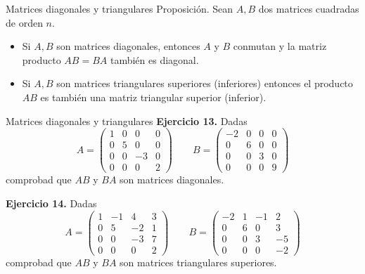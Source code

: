 \documentclass[
  ignorenonframetext,
]{beamer}
\providecommand{\tightlist}{%
  \setlength{\itemsep}{0pt}\setlength{\parskip}{0pt}}
\begin{document}
\begin{frame}{Matrices diagonales y triangulares}
\protect\hypertarget{matrices-diagonales-y-triangulares}{}
Proposición. Sean \(A,B\) dos matrices cuadradas de orden \(n\).

\begin{itemize}
\tightlist
\item
  Si \(A,B\) son matrices diagonales, entonces \(A\) y \(B\) conmutan y
  la matriz producto \(AB=BA\) también es diagonal.
\item
  Si \(A,B\) son matrices triangulares superiores (inferiores) entonces
  el producto \(AB\) es también una matriz triangular superior
  (inferior).
\end{itemize}
\end{frame}

\begin{frame}{Matrices diagonales y triangulares}
\protect\hypertarget{matrices-diagonales-y-triangulares-1}{}
\textbf{Ejercicio 13.} Dadas
\[A=\begin{pmatrix}1&0&0&0\\0&5&0&0\\0&0&-3&0\\0&0&0&2\end{pmatrix}\qquad B=\begin{pmatrix}-2&0&0&0\\0&6&0&0\\0&0&3&0\\0&0&0&9\end{pmatrix}\]
comprobad que \(AB\) y \(BA\) son matrices diagonales.

\textbf{Ejercicio 14.} Dadas
\[A=\begin{pmatrix}1&-1&4&3\\0&5&-2&1\\0&0&-3&7\\0&0&0&2\end{pmatrix}\qquad B=\begin{pmatrix}-2&1&-1&2\\0&6&0&3\\0&0&3&-5\\0&0&0&-2\end{pmatrix}\]
comprobad que \(AB\) y \(BA\) son matrices triangulares superiores.
\end{frame}
\end{document}
